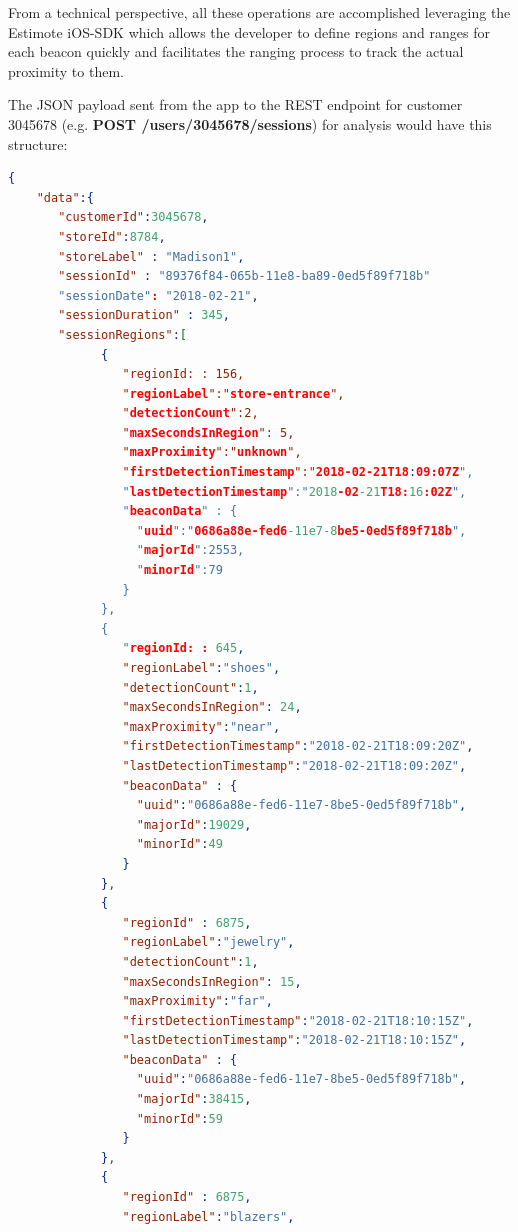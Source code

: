 From a technical perspective, all these operations are accomplished leveraging the Estimote iOS-SDK \cite{estimote-ios-sdk} which allows the developer to define regions and ranges for each beacon quickly and facilitates the ranging process to track the actual proximity to them.

The JSON payload sent from the app to the REST endpoint for customer 3045678 (e.g. \textbf{POST /users/3045678/sessions}) for analysis would have this structure:


\vspace{0.5cm}
\begin{lstlisting}[language=json,firstnumber=1]
  {
    "data":{
       "customerId":3045678,
       "storeId":8784,
       "storeLabel" : "Madison1",
       "sessionId" : "89376f84-065b-11e8-ba89-0ed5f89f718b"
       "sessionDate": "2018-02-21",
       "sessionDuration" : 345,
       "sessionRegions":[
             {
                "regionId: : 156,
                "regionLabel":"store-entrance",
                "detectionCount":2,
                "maxSecondsInRegion": 5,
                "maxProximity":"unknown",
                "firstDetectionTimestamp":"2018-02-21T18:09:07Z",
                "lastDetectionTimestamp":"2018-02-21T18:16:02Z",
                "beaconData" : {
                  "uuid":"0686a88e-fed6-11e7-8be5-0ed5f89f718b",
                  "majorId":2553,
                  "minorId":79
                }
             },
             {
                "regionId: : 645,
                "regionLabel":"shoes",
                "detectionCount":1,
                "maxSecondsInRegion": 24,
                "maxProximity":"near",
                "firstDetectionTimestamp":"2018-02-21T18:09:20Z",
                "lastDetectionTimestamp":"2018-02-21T18:09:20Z",
                "beaconData" : {
                  "uuid":"0686a88e-fed6-11e7-8be5-0ed5f89f718b",
                  "majorId":19029,
                  "minorId":49
                }
             },
             {
                "regionId" : 6875,
                "regionLabel":"jewelry",
                "detectionCount":1,
                "maxSecondsInRegion": 15,
                "maxProximity":"far",
                "firstDetectionTimestamp":"2018-02-21T18:10:15Z",
                "lastDetectionTimestamp":"2018-02-21T18:10:15Z",
                "beaconData" : {
                  "uuid":"0686a88e-fed6-11e7-8be5-0ed5f89f718b",
                  "majorId":38415,
                  "minorId":59
                }
             },
             {
                "regionId" : 6875,
                "regionLabel":"blazers",

\end{lstlisting}
